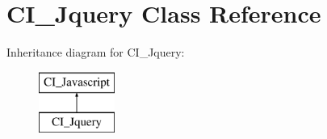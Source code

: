 \hypertarget{class_c_i___jquery}{\section{C\-I\-\_\-\-Jquery Class Reference}
\label{class_c_i___jquery}
}
Inheritance diagram for C\-I\-\_\-\-Jquery\-:\begin{figure}[H]
\begin{center}
\leavevmode
\includegraphics[height=2.000000cm]{class_c_i___jquery}
\end{center}
\end{figure}
